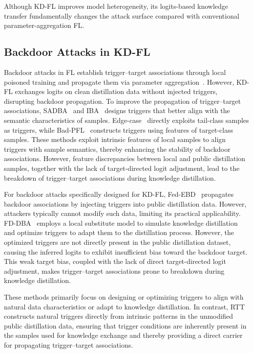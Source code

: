 \documentclass[lettersize,journal]{IEEEtran}
\newif\ifhighlight
\newcommand{\hlone}[1]{%
    \ifhighlight{\color{reviewer1}#1}\else#1\fi
}
\newcommand{\hltwo}[1]{%
    \ifhighlight{\color{reviewer2}#1}\else#1\fi
}
\begin{document}
Although KD-FL improves model heterogeneity, its logits-based knowledge transfer fundamentally changes the attack surface compared with conventional parameter-aggregation FL.

\hlone{
\subsection{Backdoor Attacks in KD-FL}
Backdoor attacks in FL establish trigger–target associations through local poisoned training and propagate them via parameter aggregation~\cite{3DFed,DBA}.
However, KD-FL exchanges logits on clean distillation data without injected triggers, disrupting backdoor propagation.
To improve the propagation of trigger–target associations, SADBA~\cite{SADBA} and IBA~\cite{IBA} designs triggers that better align with the semantic characteristics of samples.
Edge-case~\cite{edge-case} directly exploits tail-class samples as triggers, while Bad-PFL~\cite{Bad_PFL} constructs triggers using features of target-class samples.
These methods exploit intrinsic features of local samples to align triggers with sample semantics, thereby enhancing the stability of backdoor associations.
However, feature discrepancies between local and public distillation samples, together with the lack of target-directed logit adjustment, lead to the breakdown of trigger–target associations during knowledge distillation.

For backdoor attacks specifically designed for KD-FL, Fed-EBD~\cite{FedEBD} propagates backdoor associations by injecting triggers into public distillation data. However, attackers typically cannot modify such data, limiting its practical applicability.
FD-DBA~\cite{liu2026distributed} employs a local substitute model to simulate knowledge distillation and optimize triggers to adapt them to the distillation process.
However, the optimized triggers are not directly present in the public distillation dataset, causing the inferred logits to exhibit insufficient bias toward the backdoor target. This weak target bias, coupled with the lack of direct target-directed logit adjustment, makes trigger–target associations prone to breakdown during knowledge distillation.}

\hltwo{These methods primarily focus on designing or optimizing triggers to align with natural data characteristics or adapt to knowledge distillation. In contrast, RTT constructs natural triggers directly from intrinsic patterns in the unmodified public distillation data, ensuring that trigger conditions are inherently present in the samples used for knowledge exchange and thereby providing a direct carrier for propagating trigger--target associations.}
\end{document}
